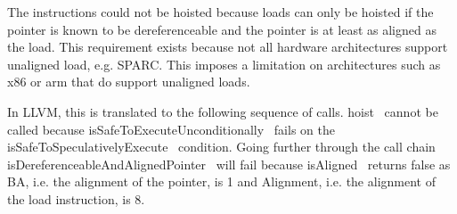The instructions could not be hoisted because loads can only be hoisted if the
pointer is known to be dereferenceable and the pointer is at least as aligned as
the load. This requirement exists because not all hardware architectures support
unaligned load, e.g. SPARC. This imposes a limitation on architectures such as
x86 or arm that do support unaligned loads.

In LLVM, this is translated to the following sequence of calls.
hoist~\cite{hoist} cannot be called because
isSafeToExecuteUnconditionally~\cite{isSafeToExecuteUnconditionally} fails on
the isSafeToSpeculativelyExecute~\cite{isSafeToSpeculativelyExecute} condition.
Going further through the call chain
isDereferenceableAndAlignedPointer~\cite{isDereferenceableAndAlignedPointer}
will fail because isAligned~\cite{isAligned} returns false as BA, i.e. the
alignment of the pointer, is 1 and Alignment, i.e. the alignment of the
load instruction, is 8.
